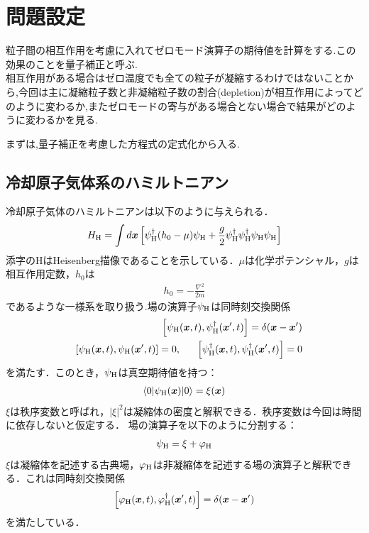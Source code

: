 \documentclass[10.5pt,a4paper]{jreport}
\begin{document}
\section{問題設定}
粒子間の相互作用を考慮に入れてゼロモード演算子の期待値を計算をする.この効果のことを量子補正と呼ぶ.\\
相互作用がある場合はゼロ温度でも全ての粒子が凝縮するわけではないことから,今回は主に凝縮粒子数と非凝縮粒子数の割合(depletion)が相互作用によってどのように変わるか,またゼロモードの寄与がある場合とない場合で結果がどのように変わるかを見る.

まずは,量子補正を考慮した方程式の定式化から入る.
\subsection{冷却原子気体系のハミルトニアン}
冷却原子気体のハミルトニアンは以下のように与えられる．
\begin{eqnarray}
  H_{\rm H}=\int d\bm{x}\left[\psi_{\rm H}^\dagger(h_0-\mu)\psi_{\rm H} +\frac{g}{2}\psi_{\rm H}^\dagger\psi_{\rm H}^\dagger\psi_{\rm H}\psi_{\rm H}\right]
\end{eqnarray}
添字のHはHeisenberg描像であることを示している．$\mu$は化学ポテンシャル，$g$は相互作用定数，$h_0$は
\begin{eqnarray}
  h_0 = -\frac{\nabla^2}{2m}
\end{eqnarray}
であるような一様系を取り扱う.場の演算子$\psi_{\rm H}$は同時刻交換関係
\begin{eqnarray}
  &&\left[\psi_{\rm H}(\bm{x},t),\psi_{\rm H}^\dagger(\bm{x}',t) \right] = \delta(\bm{x} - \bm{x}')\\
  &&\left[\psi_{\rm H}(\bm{x},t),\psi_{\rm H}(\bm{x}',t) \right] = 0,\ \ \ \ \ \left[\psi_{\rm H}^\dagger(\bm{x},t),\psi_{\rm H}^\dagger(\bm{x}',t) \right] = 0
\end{eqnarray}
を満たす．このとき，$\psi_{\rm H}$は真空期待値を持つ：
\begin{eqnarray}
  \langle 0|\psi_{\rm H}(\bm{x})|0\rangle = \xi(\bm{x})\label{vaccum_ex1}
\end{eqnarray}
$\xi$は秩序変数と呼ばれ，$|\xi|^2$は凝縮体の密度と解釈できる．秩序変数は今回は時間に依存しないと仮定する．
場の演算子を以下のように分割する：
\begin{eqnarray}
  \psi_{\rm H} = \xi + \varphi_{\rm H}
\end{eqnarray}
$\xi$は凝縮体を記述する古典場，$\varphi_{\rm H}$は非凝縮体を記述する場の演算子と解釈できる．これは同時刻交換関係
\begin{eqnarray}
  \left[\varphi_{\rm H}(\bm{x},t),\varphi^\dagger_{\rm H}(\bm{x}',t)\right]  = \delta(\bm{x}-\bm{x}')\label{equal_time_commutation}
\end{eqnarray}
を満たしている．
\end{document}
